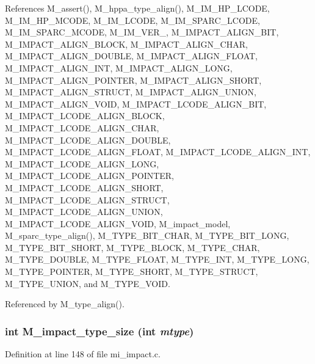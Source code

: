 References M\_\-assert(), M\_\-hppa\_\-type\_\-align(), M\_\-IM\_\-HP\_\-LCODE, M\_\-IM\_\-HP\_\-MCODE, M\_\-IM\_\-LCODE, M\_\-IM\_\-SPARC\_\-LCODE, M\_\-IM\_\-SPARC\_\-MCODE, M\_\-IM\_\-VER\_, M\_\-IMPACT\_\-ALIGN\_\-BIT, M\_\-IMPACT\_\-ALIGN\_\-BLOCK, M\_\-IMPACT\_\-ALIGN\_\-CHAR, M\_\-IMPACT\_\-ALIGN\_\-DOUBLE, M\_\-IMPACT\_\-ALIGN\_\-FLOAT, M\_\-IMPACT\_\-ALIGN\_\-INT, M\_\-IMPACT\_\-ALIGN\_\-LONG, M\_\-IMPACT\_\-ALIGN\_\-POINTER, M\_\-IMPACT\_\-ALIGN\_\-SHORT, M\_\-IMPACT\_\-ALIGN\_\-STRUCT, M\_\-IMPACT\_\-ALIGN\_\-UNION, M\_\-IMPACT\_\-ALIGN\_\-VOID, M\_\-IMPACT\_\-LCODE\_\-ALIGN\_\-BIT, M\_\-IMPACT\_\-LCODE\_\-ALIGN\_\-BLOCK, M\_\-IMPACT\_\-LCODE\_\-ALIGN\_\-CHAR, M\_\-IMPACT\_\-LCODE\_\-ALIGN\_\-DOUBLE, M\_\-IMPACT\_\-LCODE\_\-ALIGN\_\-FLOAT, M\_\-IMPACT\_\-LCODE\_\-ALIGN\_\-INT, M\_\-IMPACT\_\-LCODE\_\-ALIGN\_\-LONG, M\_\-IMPACT\_\-LCODE\_\-ALIGN\_\-POINTER, M\_\-IMPACT\_\-LCODE\_\-ALIGN\_\-SHORT, M\_\-IMPACT\_\-LCODE\_\-ALIGN\_\-STRUCT, M\_\-IMPACT\_\-LCODE\_\-ALIGN\_\-UNION, M\_\-IMPACT\_\-LCODE\_\-ALIGN\_\-VOID, M\_\-impact\_\-model, M\_\-sparc\_\-type\_\-align(), M\_\-TYPE\_\-BIT\_\-CHAR, M\_\-TYPE\_\-BIT\_\-LONG, M\_\-TYPE\_\-BIT\_\-SHORT, M\_\-TYPE\_\-BLOCK, M\_\-TYPE\_\-CHAR, M\_\-TYPE\_\-DOUBLE, M\_\-TYPE\_\-FLOAT, M\_\-TYPE\_\-INT, M\_\-TYPE\_\-LONG, M\_\-TYPE\_\-POINTER, M\_\-TYPE\_\-SHORT, M\_\-TYPE\_\-STRUCT, M\_\-TYPE\_\-UNION, and M\_\-TYPE\_\-VOID.

Referenced by M\_\-type\_\-align().
\subsubsection{\setlength{\rightskip}{0pt plus 5cm}int M\_\-impact\_\-type\_\-size (int {\em mtype})}\label{m__impact_8h_4218c869405187906b9cae1ede7897de}




Definition at line 148 of file mi\_\-impact.c.

